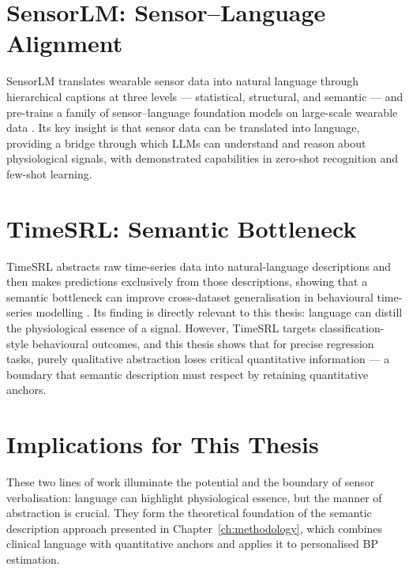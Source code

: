 \section{SensorLM: Sensor--Language Alignment}

SensorLM translates wearable sensor data into natural language through hierarchical captions at three levels --- statistical, structural, and semantic --- and pre-trains a family of sensor--language foundation models on large-scale wearable data \citep{sensorlm2025}. Its key insight is that sensor data can be translated into language, providing a bridge through which LLMs can understand and reason about physiological signals, with demonstrated capabilities in zero-shot recognition and few-shot learning.

\section{TimeSRL: Semantic Bottleneck}

TimeSRL abstracts raw time-series data into natural-language descriptions and then makes predictions exclusively from those descriptions, showing that a semantic bottleneck can improve cross-dataset generalisation in behavioural time-series modelling \citep{timesrl2026}. Its finding is directly relevant to this thesis: language can distill the physiological essence of a signal. However, TimeSRL targets classification-style behavioural outcomes, and this thesis shows that for precise regression tasks, purely qualitative abstraction loses critical quantitative information --- a boundary that semantic description must respect by retaining quantitative anchors.

\section{Implications for This Thesis}

These two lines of work illuminate the potential and the boundary of sensor verbalisation: language can highlight physiological essence, but the manner of abstraction is crucial. They form the theoretical foundation of the semantic description approach presented in Chapter~\ref{ch:methodology}, which combines clinical language with quantitative anchors and applies it to personalised BP estimation.
